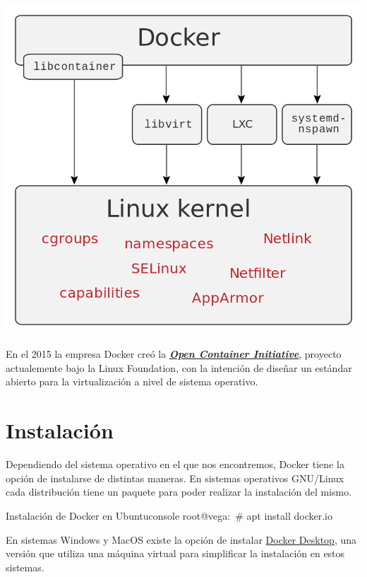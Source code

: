 \begin{center}
    \includegraphics[width=0.75\linewidth]{img/docker/docker_interfaces.png}
\end{center}

En el 2015 la empresa Docker creó la \textbf{\textit{\href{https://en.wikipedia.org/wiki/Open_Container_Initiative}{Open Container Initiative}}}, proyecto actualemente bajo la Linux Foundation, con la intención de diseñar un estándar abierto para la virtualización a nivel de sistema operativo.

\section{Instalación}

Dependiendo del sistema operativo en el que nos encontremos, Docker tiene la opción de instalarse de distintas maneras. En sistemas operativos GNU/Linux cada distribución tiene un paquete para poder realizar la instalación del mismo.

\begin{mycode}{Instalación de Docker en Ubuntu}{console}{}
root@vega:~# apt install docker.io
\end{mycode}


En sistemas Windows y MacOS existe la opción de instalar \href{https://docs.docker.com/get-docker/}{Docker Desktop}, una versión que utiliza una máquina virtual para simplificar la instalación en estos sistemas.

